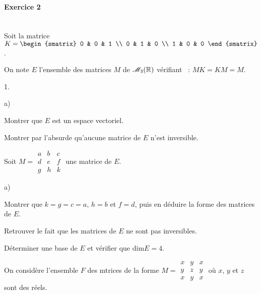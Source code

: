 \documentclass[11pt]{article}%
\begin{document}

\paragraph{ Exercice 2}

\hfill\\

Soit la matrice $K = 
\begin{smatrix}
0 & 0 & 1 \\
0 & 1 & 0 \\
1 & 0 & 0
\end{smatrix}
$.

On note $E$ l'ensemble des matrices $M$ de $\mathscr{M}_{3}(\mathbb{R})$
vérifiant~ : $MK = KM = M$.

\begin{noliste}{1.}
 \setlength{\itemsep}{4mm}
\item 
\begin{noliste}{a)}
 \setlength{\itemsep}{2mm}
\item Montrer que $E$ est un espace vectoriel.

\item Montrer par l'absurde qu'aucune matrice de $E$ n'est inversible.
\end{noliste}

\item Soit $M = \begin{matrix}
a & b & c \\
d & e & f \\
g & h & k\end{matrix}$ une matrice de $E$.

\begin{noliste}{a)}
 \setlength{\itemsep}{2mm}
\item Montrer que $k = g = c = a$, $h = b$ et $f = d$, puis en déduire
la forme des
matrices de $E$.

\item Retrouver le fait que les matrices de $E$ ne sont pas
inversibles.

\item Déterminer une base de $E$ et vérifier que $\mathrm{dim} E = 4$.
\end{noliste}

\item On considère l'ensemble $F$ des mtrices de la forme $M =
\begin{matrix}
x & y & x \\
y & z & y \\
x & y & x\end{matrix}$ où $x$, $y$ et $z$ sont des réels.


\end{noliste}
\end{document}
